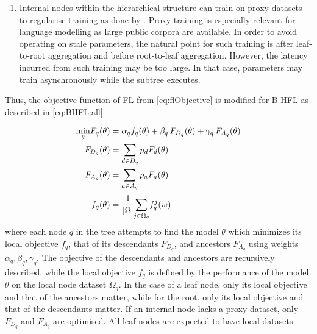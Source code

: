 \begin{singlespace*}
\begin{enumerate}
        \item Internal nodes within the hierarchical structure can train on proxy datasets to regularise training as done by \citet{OneShotFL,FLwithNonIID}. Proxy training is especially relevant for language modelling as large public corpora are available. In order to avoid operating on stale parameters, the natural point for such training is after leaf-to-root aggregation and before root-to-leaf aggregation. However, the latency incurred from such training may be too large. In that case, parameters may train asynchronously while the subtree executes.
    \end{enumerate}
\end{singlespace*}
Thus, the objective function of FL from \cref{eq:flObjective} is modified for B-HFL as described in \cref{eq:BHFL:all}

\begin{subequations}
    \begin{align}
        \underset{\theta}{\min} F_q(\theta) & = \alpha_q f_q(\theta) + \beta_q \, F_{D_q}(\theta) + \gamma_q \, F_{A_q}(\theta) \\
        F_{D_q}(\theta)                     & = \sum_{d \in D_q} p_d F_d(\theta)                                                \\
        F_{A_q}(\theta)                     & = \sum_{a \in A_q} p_a F_a(\theta)                                                \\
        f_q(\theta)                         & = \cfrac{1}{\lvert \Omega_ \rvert} \underset{j \in \Omega_q}{\sum} f_q^j(w)
    \end{align}
    \label{eq:BHFL:all}
\end{subequations}
where each node $q$ in the tree attempts to find the model $\theta$ which minimizes its local objective $f_q$, that of its descendants $F_{D_q}$, and ancestors $F_{A_q}$ using weights $\alpha_q,\beta_q,\gamma_q$. The objective of the descendants and ancestors are recursively described, while the local objective $f_q$ is defined by the performance of the model $\theta$ on the local node dataset $\Omega_q$. In the case of a leaf node, only its local objective and that of the ancestors matter, while for the root, only its local objective and that of the descendants matter. If an internal node lacks a proxy dataset, only $F_{D_q}$ and $F_{A_q}$ are optimised. All leaf nodes are expected to have local datasets.

